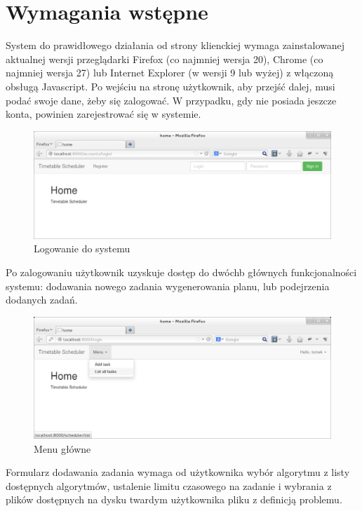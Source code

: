 \section{Wymagania wstępne}
System do prawidłowego działania od strony klienckiej wymaga zainstalowanej aktualnej wersji przeglądarki Firefox (co najmniej wersja 20), Chrome (co najmniej wersja 27) lub Internet Explorer (w wersji 9 lub wyżej) z włączoną obsługą Javascript. Po wejściu na stronę użytkownik, aby przejść dalej, musi podać swoje dane, żeby się zalogować. W przypadku, gdy nie posiada jeszcze konta, powinien zarejestrować się w systemie.
\begin{figure}[H]
\includegraphics[width=15cm]{img/guide/user1.png}
\caption{Logowanie do systemu}
\end{figure}

\par Po zalogowaniu użytkownik uzyskuje dostęp do dwóchb głównych funkcjonalności systemu: dodawania nowego zadania wygenerowania planu, lub podejrzenia dodanych zadań.

\begin{figure}[H]

\includegraphics[width=15cm]{img/guide/user3.png}
\caption{Menu główne}
\end{figure}

\par Formularz dodawania zadania wymaga od użytkownika wybór algorytmu z listy dostępnych algorytmów, ustalenie limitu czasowego na zadanie i wybrania z plików dostępnych na dysku twardym użytkownika pliku z definicją problemu.

